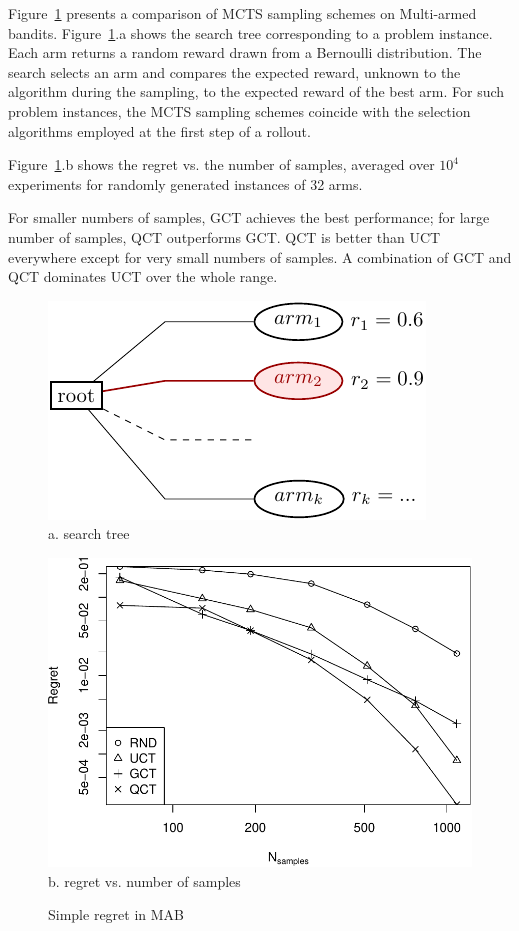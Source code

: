 \documentclass{article}
\begin{document}
Figure~\ref{fig:mab-simple-regret} presents a comparison of MCTS sampling
schemes on Multi-armed bandits. Figure~\ref{fig:mab-simple-regret}.a shows the search tree
corresponding to a problem instance. Each arm returns a random reward
drawn from a Bernoulli distribution. The search selects an arm
and compares the expected reward, unknown to the algorithm during the
sampling, to the expected reward of the best arm. For such problem
instances, the MCTS sampling schemes coincide with the selection
algorithms employed at the first step of a rollout.

Figure~\ref{fig:mab-simple-regret}.b shows the regret
vs. the number of samples, averaged
over $10^4$ experiments for randomly generated instances of 32 arms. 

For smaller numbers of samples, GCT achieves the best
performance; for large number of samples, QCT outperforms GCT. QCT is
better than UCT everywhere except for very small numbers of samples. A
combination of GCT and QCT dominates UCT over the whole range.

\begin{figure}[t]
  \begin{minipage}[c]{0.5\linewidth}
    \centering
    \includegraphics[scale=1.0]{onelevel-tree.pdf}\\
    \vspace{4em}
    a. search tree
  \end{minipage}
  \begin{minipage}[c]{0.5\linewidth}
    \centering
    \includegraphics[scale=0.5]{flat-trilevel-k=64-uqb=8.pdf}\\
    b. regret vs. number of samples
  \end{minipage}
  \label{fig:mab-simple-regret}
  \caption{Simple regret in MAB}
\end{figure}
\end{document}
